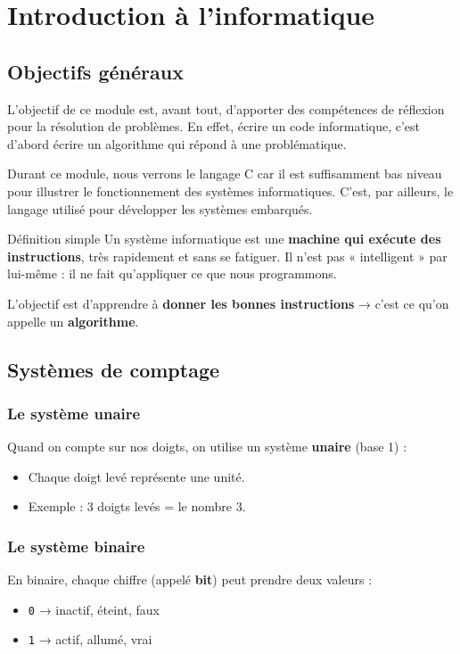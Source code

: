 
\section{Introduction à l’informatique}
\subsection{Objectifs généraux}

L'objectif de ce module est, avant tout, d'apporter des compétences de réflexion pour la résolution de problèmes. En effet, écrire un code informatique, c'est d'abord écrire un algorithme qui répond à une problématique.

Durant ce module, nous verrons le langage C car il est suffisamment bas niveau pour illustrer le fonctionnement des systèmes informatiques. C'est, par ailleurs, le langage utilisé pour développer les systèmes embarqués.


\begin{UPSTIinfor}{Définition simple}
	Un système informatique est une \textbf{machine qui exécute des instructions}, très rapidement et sans se fatiguer.
	Il n’est pas « intelligent » par lui-même : il ne fait qu’appliquer ce que nous programmons.
\end{UPSTIinfor}

L’objectif est d’apprendre à \textbf{donner les bonnes instructions} → c’est ce qu’on appelle un \textbf{algorithme}.


\subsection{Systèmes de comptage}
\subsubsection{Le système unaire}

Quand on compte sur nos doigts, on utilise un système \textbf{unaire} (base 1) :
\begin{itemize}
	\item Chaque doigt levé représente une unité.
	\item Exemple : 3 doigts levés = le nombre 3.
\end{itemize}

\subsubsection{Le système binaire}

En binaire, chaque chiffre (appelé \textbf{bit}) peut prendre deux valeurs :
\begin{itemize}
	\item \texttt{0} → inactif, éteint, faux
	\item \texttt{1} → actif, allumé, vrai
\end{itemize}

